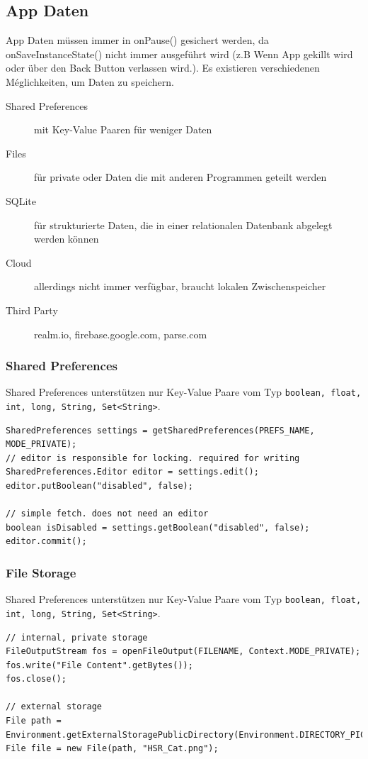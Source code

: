 \subsection{App Daten}
App Daten müssen immer in onPause() gesichert werden, da onSaveInstanceState() nicht immer ausgeführt wird (z.B Wenn App gekillt wird oder über den Back Button verlassen wird.). Es existieren verschiedenen Méglichkeiten, um Daten zu speichern.
\begin{description}
	\item[Shared Preferences] mit Key-Value Paaren für weniger Daten
	\item[Files] für private oder Daten die mit anderen Programmen geteilt werden
	\item[SQLite] für strukturierte Daten, die in einer relationalen Datenbank abgelegt werden können
	\item[Cloud] allerdings nicht immer verfügbar, braucht lokalen Zwischenspeicher
	\item[Third Party] realm.io, firebase.google.com, parse.com
\end{description}

\subsubsection{Shared Preferences}
Shared Preferences unterstützen nur Key-Value Paare vom Typ \lstinline|boolean, float, int, long, String, Set<String>|.

\begin{lstlisting}[caption=Shared Preferences]
SharedPreferences settings = getSharedPreferences(PREFS_NAME, MODE_PRIVATE);
// editor is responsible for locking. required for writing
SharedPreferences.Editor editor = settings.edit(); 
editor.putBoolean("disabled", false);

// simple fetch. does not need an editor
boolean isDisabled = settings.getBoolean("disabled", false);
editor.commit();
\end{lstlisting}

\subsubsection{File Storage}
Shared Preferences unterstützen nur Key-Value Paare vom Typ \lstinline|boolean, float, int, long, String, Set<String>|.

\begin{lstlisting}[caption=File Storage]
// internal, private storage
FileOutputStream fos = openFileOutput(FILENAME, Context.MODE_PRIVATE);
fos.write("File Content".getBytes());
fos.close();

// external storage
File path = Environment.getExternalStoragePublicDirectory(Environment.DIRECTORY_PICTURES);
File file = new File(path, "HSR_Cat.png");
\end{lstlisting}


